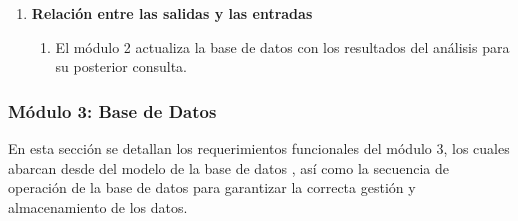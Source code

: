 \begin{enumerate}
\begin{enumerate}
            \item \textbf{Relación entre las salidas y las entradas}
                \begin{enumerate}
                    \item El módulo 2 actualiza la base de datos con los resultados del análisis para su posterior consulta.
               \end{enumerate}
        \end{enumerate}


\end{enumerate}
  

\subsubsection{Módulo 3: Base de Datos}

En esta sección se detallan los requerimientos funcionales del módulo 3,
los cuales abarcan desde del modelo de la base de datos , así como la secuencia de operación 
de la base de datos para garantizar la correcta gestión y almacenamiento de los datos.

